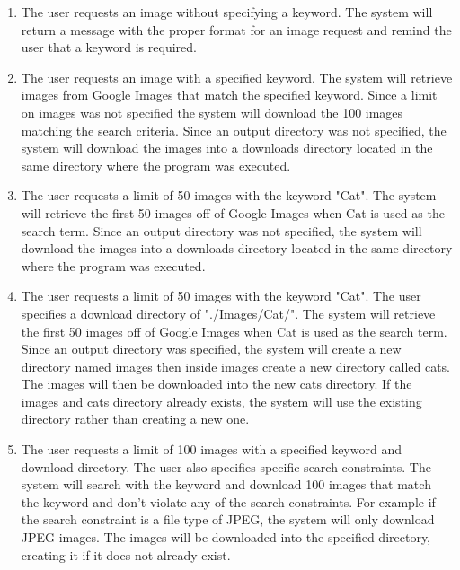 \documentclass[12pt, titlepage]{article}
\begin{document}
\begin{enumerate}[label=Scenario \arabic*:, wide=0pt, leftmargin=*]
    \item The user requests an image without specifying a keyword. The system will return a message with the proper format for an image request and remind the user that a keyword is required.
    
    \item The user requests an image with a specified keyword. The system will retrieve images from Google Images that match the specified keyword. Since a limit on images was not specified the system will download the 100 images matching the search criteria. Since an output directory was not specified, the system will download the images into a downloads directory located in the same directory where the program was executed.
    
    \item The user requests a limit of 50 images with the keyword "Cat". The system will retrieve the first 50 images off of Google Images when Cat is used as the search term. Since an output directory was not specified, the system will download the images into a downloads directory located in the same directory where the program was executed.
    
    \item The user requests a limit of 50 images with the keyword "Cat". The user specifies a download directory of "./Images/Cat/". The system will retrieve the first 50 images off of Google Images when Cat is used as the search term. Since an output directory was specified, the system will create a new directory named images then inside images create a new directory called cats. The images will then be downloaded into the new cats directory. If the images and cats directory already exists, the system will use the existing directory rather than creating a new one.
    
    \item The user requests a limit of 100 images with a specified keyword and download directory. The user also specifies specific search constraints. The system will search with the keyword and download 100 images that match the keyword and don't violate any of the search constraints. For example if the search constraint is a file type of JPEG, the system will only download JPEG images. The images will be downloaded into the specified directory, creating it if it does not already exist.
    
\end{enumerate}
\end{document}

